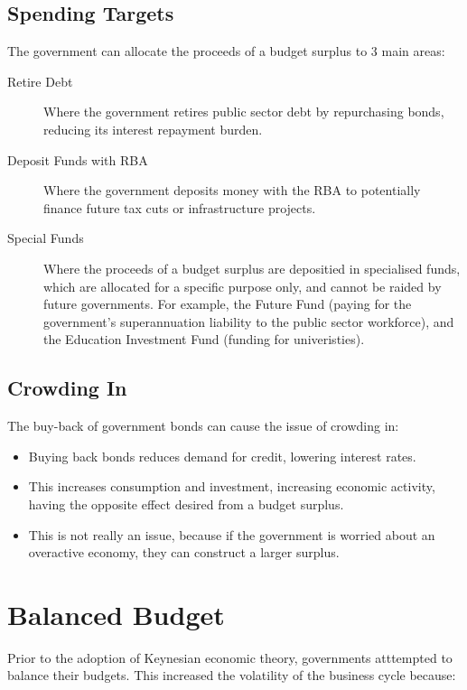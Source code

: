 \documentclass[a4paper,11pt]{report}
\begin{document}
\subsection{Spending Targets}

The government can allocate the proceeds of a budget surplus to 3 main areas:

\begin{description}
\item [Retire Debt] Where the government retires public sector debt by
	repurchasing bonds, reducing its interest repayment burden.
\item [Deposit Funds with RBA] Where the government deposits money with the RBA
	to potentially finance future tax cuts or infrastructure projects.
\item [Special Funds] Where the proceeds of a budget surplus are depositied in
	specialised funds, which are allocated for a specific purpose only, and
	cannot be raided by future governments. For example, the Future Fund (paying
	for the government's superannuation liability to the public sector
	workforce), and the Education Investment Fund (funding for univeristies).
\end{description}

\subsection{Crowding In}

The buy-back of government bonds can cause the issue of crowding in:

\begin{itemize}
\item Buying back bonds reduces demand for credit, lowering interest rates.
\item This increases consumption and investment, increasing economic activity,
	having the opposite effect desired from a budget surplus.
\item This is not really an issue, because if the government is worried about
	an overactive economy, they can construct a larger surplus.
\end{itemize}


\section{Balanced Budget}

Prior to the adoption of Keynesian economic theory, governments atttempted to
balance their budgets.
This increased the volatility of the business cycle because:
\end{document}
